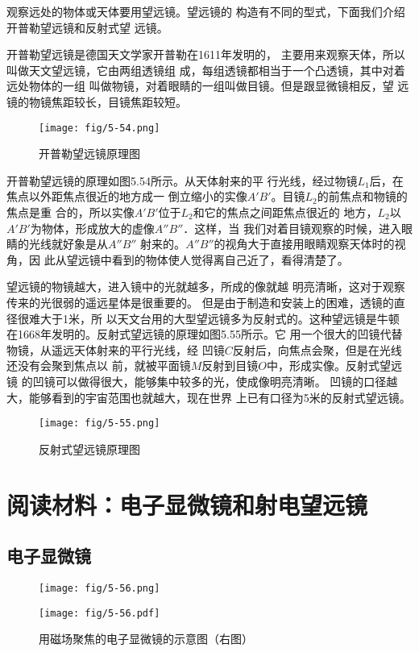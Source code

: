 观察远处的物体或天体要用望远镜。望远镜的
构造有不同的型式，下面我们介绍开普勒望远镜和反射式望
远镜。

开普勒望远镜是德国天文学家开普勒在1611年发明的，
主要用来观察天体，所以叫做天文望远镜，它由两组透镜组
成，每组透镜都相当于一个凸透镜，其中对着远处物体的一组
叫做物镜，对着眼睛的一组叫做目镜。但是跟显微镜相反，望
远镜的物镜焦距较长，目镜焦距较短。
\begin{figure}[htp]\centering
    \texttt{[image: fig/5-54.png]}
    \caption{开普勒望远镜原理图}
    \end{figure}

开普勒望远镜的原理如图5.54所示。从天体射来的平
行光线，经过物镜$L_1$后，在焦点以外距焦点很近的地方成一
倒立缩小的实像$A'B'$。目镜$L_2$的前焦点和物镜的焦点是重
合的，所以实像$A'B'$位于$L_2$和它的焦点之间距焦点很近的
地方，$L_2$以$A'B'$为物体，形成放大的虚像$A''B''$．这样，当
我们对着目镜观察的时候，进入眼睛的光线就好象是从$A''B''$
射来的。$A''B''$的视角大于直接用眼睛观察天体时的视角，因
此从望远镜中看到的物体使人觉得离自己近了，看得清楚了。

望远镜的物镜越大，进入镜中的光就越多，所成的像就越
明亮清晰，这对于观察传来的光很弱的遥远星体是很重要的。
但是由于制造和安装上的困难，透镜的直径很难大于1米，所
以天文台用的大型望远镜多为反射式的。这种望远镜是牛顿
在1668年发明的。反射式望远镜的原理如图5.55所示。它
用一个很大的凹镜代替物镜，从遥远天体射来的平行光线，经
凹镜$C$反射后，向焦点会聚，但是在光线还没有会聚到焦点以
前，就被平面镜$M$反射到目镜$O$中，形成实像。反射式望远镜
的凹镜可以做得很大，能够集中较多的光，使成像明亮清晰。
凹镜的口径越大，能够看到的宇宙范围也就越大，现在世界
上已有口径为5米的反射式望远镜。
\begin{figure}[htp]\centering
    \texttt{[image: fig/5-55.png]}
    \caption{反射式望远镜原理图}
    \end{figure}

\section*{阅读材料：电子显微镜和射电望远镜}
\subsection*{电子显微镜}

    \begin{figure}[htp]
        \centering
        \begin{minipage}[t]{0.48\textwidth}
        \centering
        \texttt{[image: fig/5-56.png]}
        \end{minipage}
        \begin{minipage}[t]{0.48\textwidth}
        \centering
        \texttt{[image: fig/5-56.pdf]}
        \end{minipage}
        \caption{用磁场聚焦的电子显微镜的示意图（右图）}
        \end{figure}

